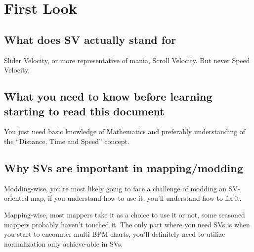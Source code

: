 \section{First Look}
\subsection{What does SV actually stand for}
Slider Velocity, or more representative of mania, Scroll Velocity. But never Speed Velocity.
\subsection{What you need to know before learning starting to read this document}
You just need basic knowledge of Mathematics and preferably understanding of the “Distance, Time and Speed” concept.
\subsection{Why SVs are important in mapping/modding}
Modding-wise, you’re most likely going to face a challenge of modding an SV-oriented map, if you understand how to use it, you’ll understand how to fix it.

Mapping-wise, most mappers take it as a choice to use it or not, some seasoned mappers probably haven’t touched it.
The only part where you need SVs is when you start to encounter multi-BPM charts, you’ll definitely need to utilize normalization only achieve-able in SVs.